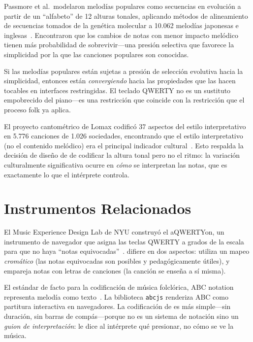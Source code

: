 \documentclass[11pt]{article}
\begin{document}
Passmore et al.\ modelaron melodías populares como secuencias en evolución a partir de un ``alfabeto'' de 12 alturas tonales, aplicando métodos de alineamiento de secuencias tomados de la genética molecular a 10.062 melodías japonesas e inglesas~\citep{passmore2023cultural}. Encontraron que los cambios de notas con menor impacto melódico tienen más probabilidad de sobrevivir---una presión selectiva que favorece la simplicidad por la que las canciones populares son conocidas.

\begin{card}

Si las melodías populares están sujetas a presión de selección evolutiva hacia la simplicidad, entonces están \emph{convergiendo} hacia las propiedades que las hacen tocables en interfaces restringidas. El teclado QWERTY no es un sustituto empobrecido del piano---es una restricción que coincide con la restricción que el proceso folk ya aplica.
\end{card}

El proyecto cantométrico de Lomax codificó 37 aspectos del estilo interpretativo en 5.776 canciones de 1.026 sociedades, encontrando que el estilo interpretativo (no el contenido melódico) era el principal indicador cultural~\citep{lomax1968folk}. Esto respalda la decisión de diseño de \np{} de codificar la altura tonal pero no el ritmo: la variación culturalmente significativa ocurre en \emph{cómo} se interpretan las notas, que es exactamente lo que el intérprete controla.

\section{Instrumentos Relacionados}

\begin{card}
El Music Experience Design Lab de NYU construyó el aQWERTYon, un instrumento de navegador que asigna las teclas QWERTY a grados de la escala para que no haya ``notas equivocadas''~\citep{hein2017aqwertyon}. \np{} difiere en dos aspectos: utiliza un mapeo \emph{cromático} (las notas equivocadas son posibles y pedagógicamente útiles), y empareja notas con letras de canciones (la canción se enseña a sí misma).
\end{card}

\begin{card}
El estándar de facto para la codificación de música folclórica, ABC notation representa melodía como texto~\citep{walshaw2011abc}. La biblioteca \texttt{abcjs} renderiza ABC como partitura interactiva en navegadores. La codificación de \np{} es más simple---sin duración, sin barras de compás---porque no es un sistema de notación sino un \emph{guion de interpretación}: le dice al intérprete qué presionar, no cómo se ve la música.
\end{card}
\end{document}

